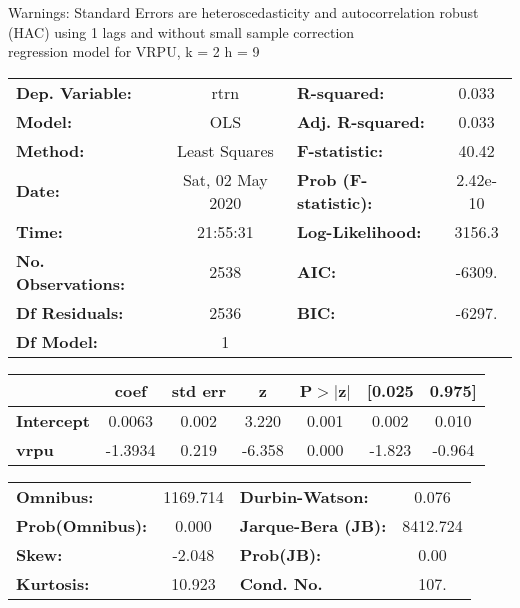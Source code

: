 Warnings: \newline
 [1] Standard Errors are heteroscedasticity and autocorrelation robust (HAC) using 1 lags and without small sample correction\\ 

regression model for VRPU, k = 2 h = 9\begin{center}
\begin{tabular}{lclc}
\toprule
\textbf{Dep. Variable:}    &       rtrn       & \textbf{  R-squared:         } &     0.033   \\
\textbf{Model:}            &       OLS        & \textbf{  Adj. R-squared:    } &     0.033   \\
\textbf{Method:}           &  Least Squares   & \textbf{  F-statistic:       } &     40.42   \\
\textbf{Date:}             & Sat, 02 May 2020 & \textbf{  Prob (F-statistic):} &  2.42e-10   \\
\textbf{Time:}             &     21:55:31     & \textbf{  Log-Likelihood:    } &    3156.3   \\
\textbf{No. Observations:} &        2538      & \textbf{  AIC:               } &    -6309.   \\
\textbf{Df Residuals:}     &        2536      & \textbf{  BIC:               } &    -6297.   \\
\textbf{Df Model:}         &           1      & \textbf{                     } &             \\
\bottomrule
\end{tabular}
\begin{tabular}{lcccccc}
                   & \textbf{coef} & \textbf{std err} & \textbf{z} & \textbf{P$> |$z$|$} & \textbf{[0.025} & \textbf{0.975]}  \\
\midrule
\textbf{Intercept} &       0.0063  &        0.002     &     3.220  &         0.001        &        0.002    &        0.010     \\
\textbf{vrpu}      &      -1.3934  &        0.219     &    -6.358  &         0.000        &       -1.823    &       -0.964     \\
\bottomrule
\end{tabular}
\begin{tabular}{lclc}
\textbf{Omnibus:}       & 1169.714 & \textbf{  Durbin-Watson:     } &    0.076  \\
\textbf{Prob(Omnibus):} &   0.000  & \textbf{  Jarque-Bera (JB):  } & 8412.724  \\
\textbf{Skew:}          &  -2.048  & \textbf{  Prob(JB):          } &     0.00  \\
\textbf{Kurtosis:}      &  10.923  & \textbf{  Cond. No.          } &     107.  \\
\bottomrule
\end{tabular}
\end{center}

